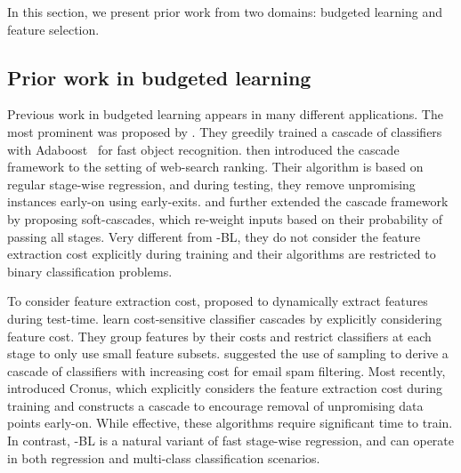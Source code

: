 
In this section, we present prior work from two domains: budgeted learning and feature selection. 

\subsection{Prior work in budgeted learning}
Previous work in budgeted learning appears in many different applications. The most prominent was proposed by \citet{viola2004robust}. They greedily trained a cascade of classifiers with Adaboost~\citep{schapire1999brief} for fast object recognition.  \citet{cambazoglu2010early} then introduced the cascade framework to the setting of web-search ranking. Their algorithm is based on regular stage-wise regression, and during testing, they remove unpromising instances early-on using early-exits. \citet{Lefakis2010} and \citet{dundar2007joint} further extended the cascade framework by proposing soft-cascades, which re-weight inputs based on their probability of passing all stages. Very different from \name{}-BL, they do not consider the feature extraction cost explicitly during training and their algorithms are restricted to binary classification problems. 

To consider feature extraction cost, \citet{GaoKoller11} proposed to dynamically extract features during test-time. \citet{raykar2010designing} learn cost-sensitive classifier cascades by explicitly considering feature cost. They group features by their costs and restrict classifiers at each stage to only use small  feature subsets. \citet{pujara2011using} suggested the use of sampling to derive a cascade of classifiers with increasing cost for email spam filtering.  Most recently, \citet{chen2011} introduced Cronus, which explicitly considers the feature extraction cost during training and constructs a cascade to encourage removal of unpromising data points early-on. While effective, these algorithms require significant time to train. In contrast, \name{}-BL is a natural variant of fast stage-wise regression, and can operate in both regression and multi-class classification scenarios. 


